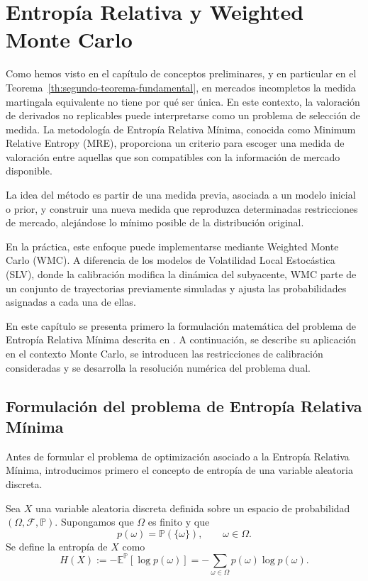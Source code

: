 \chapter{Entropía Relativa y Weighted Monte Carlo}

Como hemos visto en el capítulo de conceptos preliminares, y en particular en el Teorema~\ref{th:segundo-teorema-fundamental}, en mercados incompletos la medida martingala equivalente no tiene por qué ser única. En este contexto, la valoración de derivados no replicables puede interpretarse como un problema de selección de medida. La metodología de Entropía Relativa Mínima, conocida como Minimum Relative Entropy (MRE), proporciona un criterio para escoger una medida de valoración entre aquellas que son compatibles con la información de mercado disponible.\medskip

La idea del método es partir de una medida previa, asociada a un modelo inicial o prior, y construir una nueva medida que reproduzca determinadas restricciones de mercado, alejándose lo mínimo posible de la distribución original.\medskip

En la práctica, este enfoque puede implementarse mediante Weighted Monte Carlo (WMC). A diferencia de los modelos de Volatilidad Local Estocástica (SLV), donde la calibración modifica la dinámica del subyacente, WMC parte de un conjunto de trayectorias previamente simuladas y ajusta las probabilidades asignadas a cada una de ellas.\medskip

En este capítulo se presenta primero la formulación matemática del problema de Entropía Relativa Mínima descrita en \cite{articleAvellaneda}. A continuación, se describe su aplicación en el contexto Monte Carlo, se introducen las restricciones de calibración consideradas y se desarrolla la resolución numérica del problema dual.

\section{Formulación del problema de Entropía Relativa Mínima}

Antes de formular el problema de optimización asociado a la Entropía Relativa Mínima, introducimos primero el concepto de entropía de una variable aleatoria discreta.

\begin{definition}
Sea \(X\) una variable aleatoria discreta definida sobre un espacio de probabilidad \((\Omega,\mathcal{F},\mathbb{P})\). Supongamos que \(\Omega\) es finito y que
\[
p(\omega)=\mathbb{P}(\{\omega\}), \qquad \omega\in\Omega.
\]
Se define la entropía de \(X\) como
\[
H(X)
:=
-\mathbb{E}^{\mathbb{P}}\left[\log p(\omega)\right]
=
-\sum_{\omega\in\Omega}
p(\omega)\log p(\omega).
\]
\end{definition}

